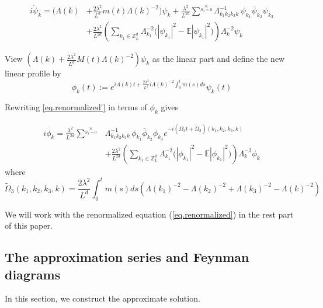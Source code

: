 \begin{equation}\label{eq.renormalized'}
\begin{split}
i \dot{\psi}_{k} 
=  \bigg(\Lambda(k)&+\frac{2\lambda^2}{L^{d}} m(t)\Lambda(k)^{-2}\bigg) \psi_k
+\frac{\lambda^2}{L^{2d}} \sum^{\times}\limits_{S_3=0}  \Lambda_{k_1k_2k_3k}^{-1}\,\psi_{k_1}\overline{\psi}_{k_2}  \psi_{k_3}
\\
&+\frac{2\lambda^2}{L^{2d}} \left(\sum\limits_{k_1\in \mathbb{Z}^d_L} \Lambda_{k_1}^{-2}\Big(|\psi_{k_1}|^2-\mathbb{E} |\psi_{k_1}|^2\Big) \right) \Lambda_{k}^{-2}\psi_{k}    
\end{split}
\end{equation}

View $\left(\Lambda(k)+\frac{2\lambda^2}{L^{d}} M(t)\Lambda(k)^{-2}\right) \psi_k$ as the linear part and define the new linear profile by
\begin{equation}
\phi_k(t):= e^{i\Lambda(k) t+\frac{2\lambda^2}{L^{d}} i \Lambda(k)^{-2}\int^t_{0}m(s) ds}  \psi_k(t)    
\end{equation}

Rewriting \eqref{eq.renormalized'} in terms of $\phi_k$ gives  

\begin{equation}\label{eq.renormalized}
\begin{split}
i \dot{\phi}_{k} 
= \frac{\lambda^2}{L^{2d}} \sum^{\times}\limits_{S_3=0} & \Lambda_{k_1k_2k_3k}^{-1}\,\phi_{k_1}\overline{\phi}_{k_2}  \phi_{k_3}e^{- i (\Omega_3t+\widetilde{\Omega}_3)(k_1,k_2,k_3,k)}
\\
&+\frac{2\lambda^2}{L^{2d}} \left(\sum\limits_{k_1\in \mathbb{Z}^d_L} \Lambda_{k_1}^{-2}\Big(|\phi_{k_1}|^2-\mathbb{E} |\phi_{k_1}|^2\Big) \right) \Lambda_{k}^{-2}\phi_{k}    
\end{split}
\end{equation}
where
\begin{equation}
    \widetilde{\Omega}_3(k_1,k_2,k_3,k)=\frac{2\lambda^2}{L^{d}} \int^t_{0}m(s) ds\left(\Lambda(k_1)^{-2}-\Lambda(k_2)^{-2}+\Lambda(k_3)^{-2}-\Lambda(k)^{-2}\right)
\end{equation}

We will work with the renormalized equation (\ref{eq.renormalized}) in the rest part of this paper. 

\subsection{The approximation series and Feynman diagrams}\label{sec.appFey} In this section, we construct the approximate solution. 

